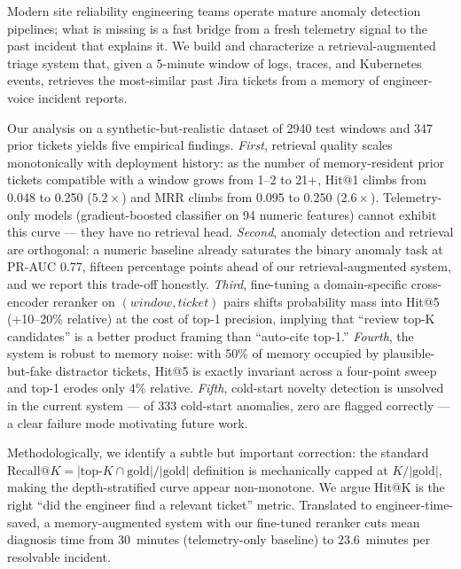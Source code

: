 Modern site reliability engineering teams operate mature anomaly detection pipelines; what is missing is a fast bridge from a fresh telemetry signal to the past incident that explains it. We build and characterize a retrieval-augmented triage system that, given a 5-minute window of logs, traces, and Kubernetes events, retrieves the most-similar past Jira tickets from a memory of engineer-voice incident reports.

Our analysis on a synthetic-but-realistic dataset of 2940 test windows and 347 prior tickets yields five empirical findings. \emph{First}, retrieval quality scales monotonically with deployment history: as the number of memory-resident prior tickets compatible with a window grows from 1--2 to 21+, Hit@1 climbs from 0.048 to 0.250 ($5.2\times$) and MRR climbs from 0.095 to 0.250 ($2.6\times$). Telemetry-only models (gradient-boosted classifier on 94 numeric features) cannot exhibit this curve --- they have no retrieval head. \emph{Second}, anomaly detection and retrieval are orthogonal: a numeric baseline already saturates the binary anomaly task at PR-AUC 0.77, fifteen percentage points ahead of our retrieval-augmented system, and we report this trade-off honestly. \emph{Third}, fine-tuning a domain-specific cross-encoder reranker on $(\textit{window}, \textit{ticket})$ pairs shifts probability mass into Hit@5 (+10--20\% relative) at the cost of top-1 precision, implying that ``review top-K candidates'' is a better product framing than ``auto-cite top-1.'' \emph{Fourth}, the system is robust to memory noise: with 50\% of memory occupied by plausible-but-fake distractor tickets, Hit@5 is exactly invariant across a four-point sweep and top-1 erodes only 4\% relative. \emph{Fifth}, cold-start novelty detection is unsolved in the current system --- of 333 cold-start anomalies, zero are flagged correctly --- a clear failure mode motivating future work.

Methodologically, we identify a subtle but important correction: the standard $\text{Recall@}K = |\text{top-}K \cap \text{gold}| / |\text{gold}|$ definition is mechanically capped at $K / |\text{gold}|$, making the depth-stratified curve appear non-monotone. We argue Hit@K is the right ``did the engineer find a relevant ticket'' metric. Translated to engineer-time-saved, a memory-augmented system with our fine-tuned reranker cuts mean diagnosis time from 30~minutes (telemetry-only baseline) to 23.6~minutes per resolvable incident.
